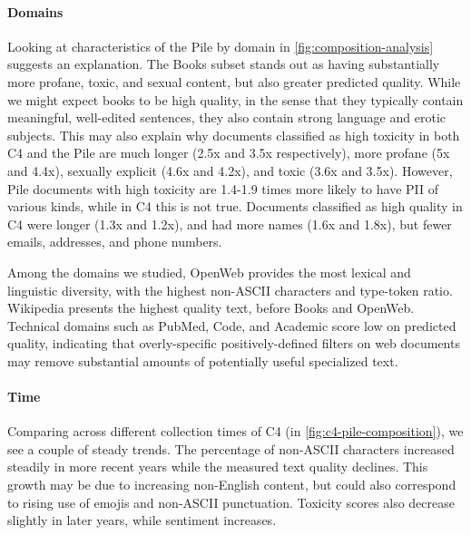 \documentclass{article}
\begin{document}
\paragraph{Domains}
Looking at characteristics of the Pile by domain in \cref{fig:composition-analysis} suggests an explanation.
The Books subset stands out as having substantially more profane, toxic, and sexual content, but also greater predicted quality.
While we might expect books to be high quality, 
in the sense that they typically contain meaningful, well-edited sentences, they also contain strong language and erotic subjects.
This may also explain why documents classified as high toxicity in both C4 and the Pile are much longer (2.5x and 3.5x respectively), more profane (5x and 4.4x), sexually explicit (4.6x and 4.2x), and toxic (3.6x and 3.5x).
However, Pile documents with high toxicity are 1.4-1.9 times more likely to have PII of various kinds, while in C4 this is not true.
Documents classified as high quality in C4 were longer (1.3x and 1.2x), and had more names (1.6x and 1.8x), but fewer emails, addresses, and phone numbers.

Among the domains we studied, OpenWeb provides the most lexical and linguistic diversity, with the highest non-ASCII characters and type-token ratio.
Wikipedia presents the highest quality text, before Books and OpenWeb.
Technical domains such as PubMed, Code, and Academic score low on predicted quality, indicating that overly-specific positively-defined filters on web documents may remove substantial amounts of potentially useful specialized text.

\vspace{-3mm}
\paragraph{Time} Comparing across different collection times of C4 (in \cref{fig:c4-pile-composition}), we see a couple of steady trends.
The percentage of non-ASCII characters increased steadily in more recent years while the measured text quality declines.
This growth may be due to increasing non-English content, but could also correspond to rising use of emojis and non-ASCII punctuation.
Toxicity scores also decrease slightly in later years, while sentiment increases. 

\end{document}
